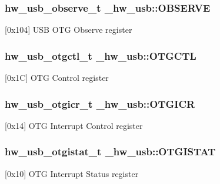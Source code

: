 \subsubsection[{\texorpdfstring{O\+B\+S\+E\+R\+VE}{OBSERVE}}]{ {\bf hw\+\_\+usb\+\_\+observe\+\_\+t} \+\_\+hw\+\_\+usb\+::\+O\+B\+S\+E\+R\+VE}\hypertarget{struct__hw__usb_ac0fc8aa8bb1e051cda250cc64d4fa7d3}{}\label{struct__hw__usb_ac0fc8aa8bb1e051cda250cc64d4fa7d3}
\mbox{[}0x104\mbox{]} U\+SB O\+TG Observe register 
\subsubsection[{\texorpdfstring{O\+T\+G\+C\+TL}{OTGCTL}}]{ {\bf hw\+\_\+usb\+\_\+otgctl\+\_\+t} \+\_\+hw\+\_\+usb\+::\+O\+T\+G\+C\+TL}\hypertarget{struct__hw__usb_ab6f60ed65ffc6800f7da32cf503da4c9}{}\label{struct__hw__usb_ab6f60ed65ffc6800f7da32cf503da4c9}
\mbox{[}0x1C\mbox{]} O\+TG Control register 
\subsubsection[{\texorpdfstring{O\+T\+G\+I\+CR}{OTGICR}}]{ {\bf hw\+\_\+usb\+\_\+otgicr\+\_\+t} \+\_\+hw\+\_\+usb\+::\+O\+T\+G\+I\+CR}\hypertarget{struct__hw__usb_a98a0bd0744e8665fa918925746537700}{}\label{struct__hw__usb_a98a0bd0744e8665fa918925746537700}
\mbox{[}0x14\mbox{]} O\+TG Interrupt Control register 
\subsubsection[{\texorpdfstring{O\+T\+G\+I\+S\+T\+AT}{OTGISTAT}}]{ {\bf hw\+\_\+usb\+\_\+otgistat\+\_\+t} \+\_\+hw\+\_\+usb\+::\+O\+T\+G\+I\+S\+T\+AT}\hypertarget{struct__hw__usb_a63226700281e0d6aead22a9a9adaa980}{}\label{struct__hw__usb_a63226700281e0d6aead22a9a9adaa980}
\mbox{[}0x10\mbox{]} O\+TG Interrupt Status register 
